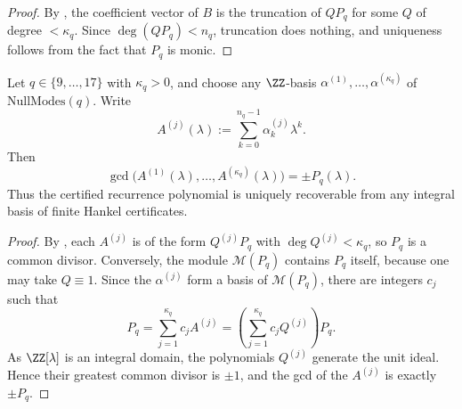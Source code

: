 \begin{proof}
By , the coefficient vector of \(B\) is the
truncation of \(QP_q\) for some \(Q\) of degree \(<\kappa_q\).  Since
\(\deg(QP_q)<n_q\), truncation does nothing, and uniqueness follows from the
fact that \(P_q\) is monic.
\end{proof}

\begin{corollary}
\label{cor:gcd-recovers-minpoly}
Let \(q\in\{9,\dots,17\}\) with \(\kappa_q>0\), and choose any \(\ZZ\)-basis
\(\alpha^{(1)},\dots,\alpha^{(\kappa_q)}\) of \(\mathrm{NullModes}(q)\).  Write
\[
  A^{(j)}(\lambda):=\sum_{k=0}^{n_q-1}\alpha^{(j)}_k\lambda^k.
\]
Then
\[
  \gcd\bigl(A^{(1)}(\lambda),\dots,A^{(\kappa_q)}(\lambda)\bigr)=\pm P_q(\lambda).
\]
Thus the certified recurrence polynomial is uniquely recoverable from any
integral basis of finite Hankel certificates.
\end{corollary}

\begin{proof}
By , each \(A^{(j)}\) is of the form
\(Q^{(j)}P_q\) with \(\deg Q^{(j)}<\kappa_q\), so \(P_q\) is a common divisor.
Conversely, the module \(\mathcal M(P_q)\) contains \(P_q\) itself, because one
may take \(Q\equiv 1\).  Since the \(\alpha^{(j)}\) form a basis of
\(\mathcal M(P_q)\), there are integers \(c_j\) such that
\[
  P_q=\sum_{j=1}^{\kappa_q} c_j A^{(j)}
  =\left(\sum_{j=1}^{\kappa_q} c_jQ^{(j)}\right)P_q.
\]
As \(\ZZ[\lambda]\) is an integral domain, the polynomials \(Q^{(j)}\) generate
the unit ideal.  Hence their greatest common divisor is \(\pm1\), and the gcd of
the \(A^{(j)}\) is exactly \(\pm P_q\).
\end{proof}

